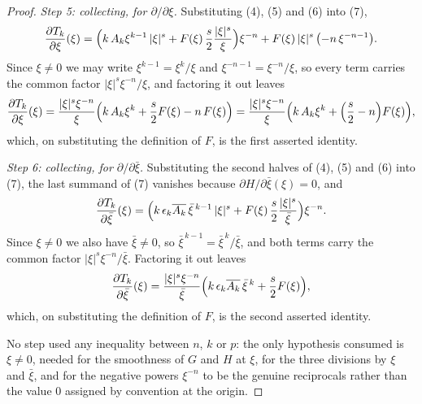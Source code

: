 \begin{proof}
\emph{Step 5: collecting, for $\partial/\partial\xi$.}  Substituting (4), (5)
and (6) into (7),
\[
  \frac{\partial T_k}{\partial\xi}(\xi)
  =\Bigl(k\,A_k\xi^{k-1}\,|\xi|^{s}
     +F(\xi)\,\frac{s}{2}\frac{|\xi|^{s}}{\xi}\Bigr)\xi^{-n}
   +F(\xi)\,|\xi|^{s}\,\bigl(-n\,\xi^{-n-1}\bigr).
\]
Since $\xi\ne0$ we may write $\xi^{k-1}=\xi^{k}/\xi$ and
$\xi^{-n-1}=\xi^{-n}/\xi$, so every term carries the common factor
$|\xi|^{s}\xi^{-n}/\xi$, and factoring it out leaves
\[
  \frac{\partial T_k}{\partial\xi}(\xi)
  =\frac{|\xi|^{s}\xi^{-n}}{\xi}
    \Bigl(k\,A_k\xi^{k}+\frac{s}{2}F(\xi)-n\,F(\xi)\Bigr)
  =\frac{|\xi|^{s}\xi^{-n}}{\xi}
    \Bigl(k\,A_k\xi^{k}+\Bigl(\frac{s}{2}-n\Bigr)F(\xi)\Bigr),
\]
which, on substituting the definition of $F$, is the first asserted identity.

\emph{Step 6: collecting, for $\partial/\partial\bar\xi$.}  Substituting the
second halves of (4), (5) and (6) into (7), the last summand of (7) vanishes
because $\partial H/\partial\bar\xi(\xi)=0$, and
\[
  \frac{\partial T_k}{\partial\bar\xi}(\xi)
  =\Bigl(k\,\epsilon_k\overline{A_k}\,\bar\xi^{\,k-1}\,|\xi|^{s}
     +F(\xi)\,\frac{s}{2}\frac{|\xi|^{s}}{\bar\xi}\Bigr)\xi^{-n}.
\]
Since $\xi\ne0$ we also have $\bar\xi\ne0$, so
$\bar\xi^{\,k-1}=\bar\xi^{\,k}/\bar\xi$, and both terms carry the common
factor $|\xi|^{s}\xi^{-n}/\bar\xi$.  Factoring it out leaves
\[
  \frac{\partial T_k}{\partial\bar\xi}(\xi)
  =\frac{|\xi|^{s}\xi^{-n}}{\bar\xi}
    \Bigl(k\,\epsilon_k\overline{A_k}\,\bar\xi^{\,k}
      +\frac{s}{2}F(\xi)\Bigr),
\]
which, on substituting the definition of $F$, is the second asserted identity.

No step used any inequality between $n$, $k$ or $p$: the only hypothesis
consumed is $\xi\ne0$, needed for the smoothness of $G$ and $H$ at $\xi$, for
the three divisions by $\xi$ and $\bar\xi$, and for the negative powers
$\xi^{-n}$ to be the genuine reciprocals rather than the value $0$ assigned by
convention at the origin.
\end{proof}
